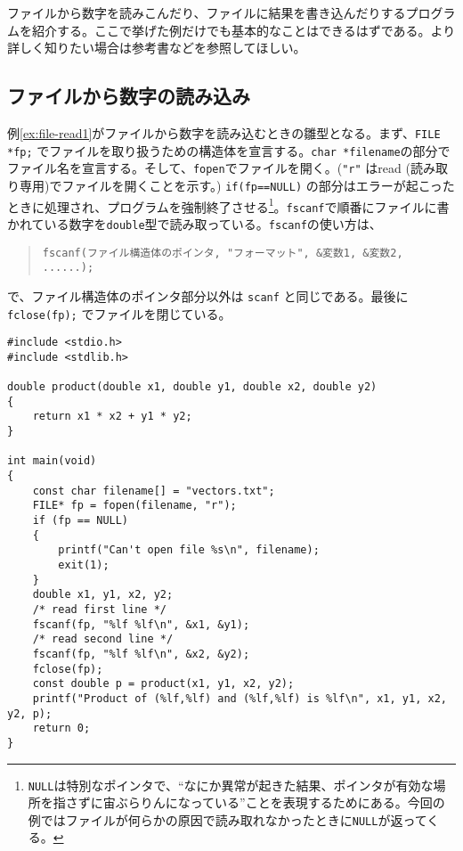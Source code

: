 ファイルから数字を読みこんだり、ファイルに結果を書き込んだりするプログラムを紹介する。ここで挙げた例だけでも基本的なことはできるはずである。より詳しく知りたい場合は参考書などを参照してほしい。

\subsection{ファイルから数字の読み込み}

例\ref{ex:file-read1}がファイルから数字を読み込むときの雛型となる。まず、\texttt{FILE *fp;} でファイルを取り扱うための構造体を宣言する。\texttt{char *filename}の部分でファイル名を宣言する。そして、\texttt{fopen}でファイルを開く。(\texttt{"r"} はread (読み取り専用)でファイルを開くことを示す。) \texttt{if(fp==NULL){}} の部分はエラーが起こったときに処理され、プログラムを強制終了させる\footnote{\texttt{NULL}は特別なポインタで、``なにか異常が起きた結果、ポインタが有効な場所を指さずに宙ぶらりんになっている''ことを表現するためにある。今回の例ではファイルが何らかの原因で読み取れなかったときに\texttt{NULL}が返ってくる。}。\texttt{fscanf}で順番にファイルに書かれている数字を\texttt{double}型で読み取っている。\texttt{fscanf}の使い方は、
\begin{quote}
    \begin{verbatim}
fscanf(ファイル構造体のポインタ, "フォーマット", &変数1, &変数2, ......);
\end{verbatim}
\end{quote}
で、ファイル構造体のポインタ部分以外は \texttt{scanf} と同じである。最後に \texttt{fclose(fp);} でファイルを閉じている。
\begin{reidai}\label{ex:file-read1}
    \begin{verbatim}
#include <stdio.h>
#include <stdlib.h>

double product(double x1, double y1, double x2, double y2)
{
    return x1 * x2 + y1 * y2;
}

int main(void)
{
    const char filename[] = "vectors.txt";
    FILE* fp = fopen(filename, "r");
    if (fp == NULL)
    {
        printf("Can't open file %s\n", filename);
        exit(1);
    }
    double x1, y1, x2, y2;
    /* read first line */
    fscanf(fp, "%lf %lf\n", &x1, &y1);
    /* read second line */
    fscanf(fp, "%lf %lf\n", &x2, &y2);
    fclose(fp);
    const double p = product(x1, y1, x2, y2);
    printf("Product of (%lf,%lf) and (%lf,%lf) is %lf\n", x1, y1, x2, y2, p);
    return 0;
}
\end{verbatim}
\end{reidai} \noindent
